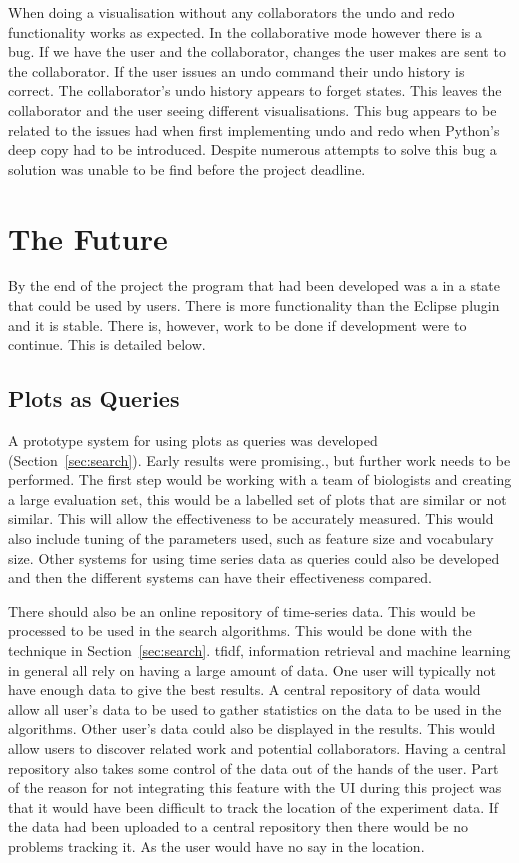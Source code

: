 When doing a visualisation without any collaborators the undo and redo functionality works as expected.  In the collaborative mode however there is a bug.  If we have the user and the collaborator, changes the user makes are sent to the collaborator.  If the user issues an undo command their undo history is correct.  The collaborator's undo history appears to forget states.  This leaves the collaborator and the user seeing different visualisations.  This bug appears to be related to the issues had when first implementing undo and redo when Python's deep copy had to be introduced.  Despite numerous attempts to solve this bug a solution was unable to be find before the project deadline.

\section{The Future}

By the end of the project the program that had been developed was a in a state that could be used by users.  There is more functionality than the Eclipse plugin and it is stable.  There is, however, work to be done if development were to continue.  This is detailed below.

\subsection{Plots as Queries}
A prototype system for using plots as queries was developed (Section~\ref{sec:search}).  Early results were promising., but further work needs to be performed.  The first step would be working with a team of biologists and creating a large evaluation set, this would be a labelled set of plots that are similar or not similar.  This will allow the effectiveness to be accurately measured.  This would also include tuning of the parameters used, such as feature size and vocabulary size.  Other systems for using time series data as queries could also be developed and then the different systems can have their effectiveness compared.

There should also be an online repository of time-series data.  This would be processed to be used in the search algorithms.  This would be done with the technique in Section~\ref{sec:search}.  \ac{tfidf}, information retrieval and machine learning in general all rely on having a large amount of data.  One user will typically not have enough data to give the best results.  A central repository of data would allow all user's data to be used to gather statistics on the data to be used in the algorithms.  Other user's data could also be displayed in the results.  This would allow users to discover related work and potential collaborators.  Having a central repository also takes some control of the data out of the hands of the user.  Part of the reason for not integrating this feature with the \ac{UI} during this project was that it would have been difficult to track the location of the experiment data.  If the data had been uploaded to a central repository then there would be no problems tracking it.  As the user would have no say in the location.


